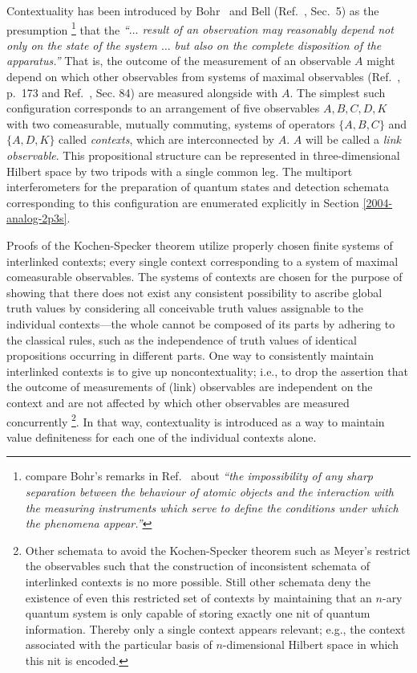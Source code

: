 \documentclass[pra,preprint,showpacs,showkeys,amsfonts]{revtex4}
\begin{document}
Contextuality \cite{bell-66,hey-red,redhead} has been
introduced by Bohr~\cite{bohr-1949} and Bell (Ref.~\cite{bell-66}, Sec.~5)
as the
presumption
\footnote{
compare Bohr's
remarks in Ref.~\cite{bohr-1949}
about {\em ``the impossibility of any sharp separation
between the behaviour of atomic objects and the interaction with the measuring instruments which serve to define
the conditions under which the phenomena appear.''}
}
that the {\em ``$\ldots$
result of an observation may reasonably depend
not only on the state of the system  $\ldots$
but also on the complete disposition  of the apparatus.''}
That is, the outcome of the measurement of an observable  $A$
might depend on which other observables
from systems of maximal observables
(Ref.~\cite{v-neumann-49}, p.~173 and Ref.~\cite{halmos-vs}, Sec. 84)
are measured alongside with $A$.
The simplest such configuration corresponds to an arrangement
of five observables $A,B,C,D,K$ with two comeasurable, mutually commuting, systems
of operators
$\{A,B,C\}$
and
$\{A,D,K\}$
called {\em contexts},
which are interconnected by $A$.
$A$ will be called a {\em link observable}.
This propositional structure can be represented in three-dimensional Hilbert space
by two tripods with a single common leg.
The multiport interferometers
for the preparation of quantum states
and detection schemata corresponding to this configuration are enumerated explicitly
in Section \ref{2004-analog-2p3s}.

Proofs of the Kochen-Specker theorem
\cite{specker-60,kamber64,kamber65,ZirlSchl-65,bell-66,kochen1,Alda,Alda2,peres,mermin-93,svozil-tkadlec,tkadlec-00,svozil-ql}
utilize properly chosen finite systems of interlinked contexts;
every single context corresponding to a system
of maximal comeasurable observables.
The systems of contexts are chosen for the purpose of showing that there does not exist
any consistent possibility to ascribe global truth values by considering all conceivable
truth values assignable to the individual contexts---the whole cannot be composed of
its parts by adhering to the classical rules, such as
the independence of truth values of identical propositions occurring in different parts.
One way to consistently maintain interlinked contexts
is to give up noncontextuality; i.e., to drop
the assertion that the outcome of measurements of (link) observables are
independent on the context and are not affected by which other observables are measured concurrently
\footnote{
Other schemata to avoid the Kochen-Specker theorem such as Meyer's \cite{meyer:99}
restrict the observables such that the construction of inconsistent schemata of interlinked contexts
is no more possible.
Still other schemata \cite{svozil-2003-garda} deny the existence of even this restricted set of contexts
by maintaining that an $n$-ary quantum system is only capable of storing
exactly one nit of quantum information. Thereby only a single context appears relevant;
e.g., the context associated with the particular basis of $n$-dimensional Hilbert space
in which this nit is encoded.}.
In that way, contextuality is introduced as a way to maintain value definiteness
for each one of the individual contexts alone.
\end{document}

